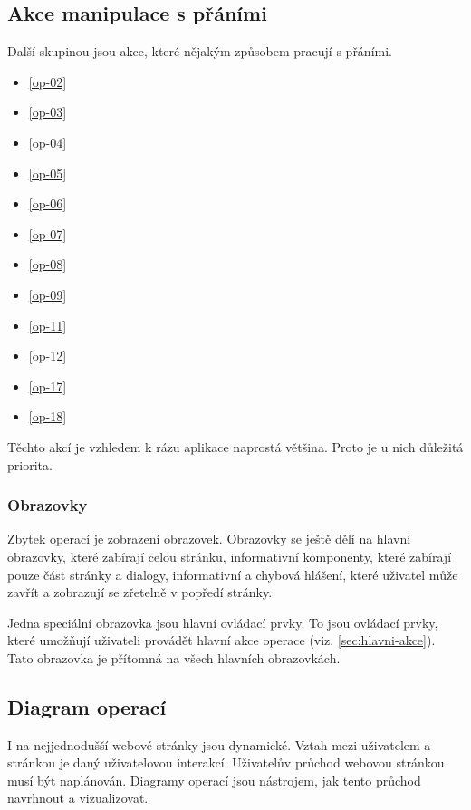 \subsection{Akce manipulace s přáními}
Další skupinou jsou akce, které nějakým způsobem pracují s přáními.
\begin{multicols}{2}
\begin{itemize}
\item \ref{op-02}
\item \ref{op-03}
\item \ref{op-04}
\item \ref{op-05}
\item \ref{op-06}
\item \ref{op-07}
\item \ref{op-08}
\item \ref{op-09}
\item \ref{op-11}
\item \ref{op-12}
\item \ref{op-17}
\item \ref{op-18}
\end{itemize}
\end{multicols}

Těchto akcí je vzhledem k rázu aplikace naprostá většina. Proto je u nich důležitá priorita.

\subsubsection{Obrazovky}
Zbytek operací je zobrazení obrazovek. Obrazovky se ještě dělí na hlavní obrazovky, které zabírají celou stránku, informativní komponenty, které zabírají pouze část stránky a dialogy, informativní a chybová hlášení, které uživatel může zavřít a zobrazují se zřetelně v popředí stránky.

Jedna speciální obrazovka jsou hlavní ovládací prvky. To jsou ovládací prvky, které umožňují uživateli provádět hlavní akce operace (viz. \ref{sec:hlavni-akce}). Tato obrazovka je přítomná na všech hlavních obrazovkách.

\subsection{Diagram operací}
I na nejjednodušší webové stránky jsou dynamické. Vztah mezi uživatelem a stránkou je daný uživatelovou interakcí. Uživatelův průchod webovou stránkou musí být naplánován. Diagramy operací jsou nástrojem, jak tento průchod navrhnout a vizualizovat\cite{brown2007communicating}.

